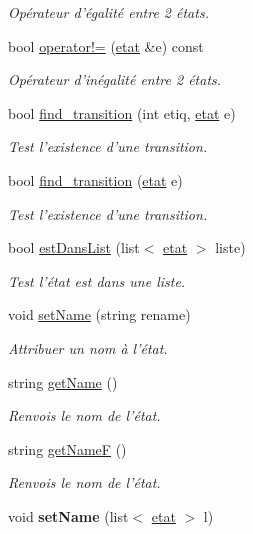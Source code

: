 \begin{DoxyCompactItemize}
\begin{DoxyCompactList}\small\item\em Opérateur d'égalité entre 2 états. \end{DoxyCompactList}\item 
bool \hyperlink{classetat_a5841b1b0055485e6d3edc6d9b1c500cb}{operator!=} (\hyperlink{classetat}{etat} \&e) const 
\begin{DoxyCompactList}\small\item\em Opérateur d'inégalité entre 2 états. \end{DoxyCompactList}\item 
bool \hyperlink{classetat_acab203fc095b3974136c4f73895df9a6}{find\-\_\-transition} (int etiq, \hyperlink{classetat}{etat} e)
\begin{DoxyCompactList}\small\item\em Test l'existence d'une transition. \end{DoxyCompactList}\item 
bool \hyperlink{classetat_adc481f8f4c2c2357a88ac925e6440a8b}{find\-\_\-transition} (\hyperlink{classetat}{etat} e)
\begin{DoxyCompactList}\small\item\em Test l'existence d'une transition. \end{DoxyCompactList}\item 
bool \hyperlink{classetat_a381028a7a37e890734c1cc4afe05bd55}{est\-Dans\-List} (list$<$ \hyperlink{classetat}{etat} $>$ liste)
\begin{DoxyCompactList}\small\item\em Test l'état est dans une liste. \end{DoxyCompactList}\item 
void \hyperlink{classetat_a935983bd0159129dbd0bbddb50e1dd8a}{set\-Name} (string rename)
\begin{DoxyCompactList}\small\item\em Attribuer un nom à l'état. \end{DoxyCompactList}\item 
string \hyperlink{classetat_a938d2165beabfb6de3ad16e2a15b05c5}{get\-Name} ()
\begin{DoxyCompactList}\small\item\em Renvois le nom de l'état. \end{DoxyCompactList}\item 
string \hyperlink{classetat_a37ee0f6502f471dd3566733f8a1bc8fe}{get\-Name\-F} ()
\begin{DoxyCompactList}\small\item\em Renvois le nom de l'état. \end{DoxyCompactList}\item 
\hypertarget{classetat_a87882f3b4b4e3bae6b7a22008241d836}{void {\bfseries set\-Name} (list$<$ \hyperlink{classetat}{etat} $>$ l)}\label{classetat_a87882f3b4b4e3bae6b7a22008241d836}

\end{DoxyCompactItemize}

